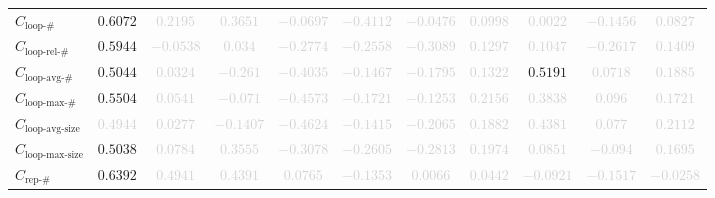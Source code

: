 \documentclass{standalone}
\newcommand{\loopnumname}{\text{loop-\#}}
\newcommand{\loopnum}{C_{\loopnumname}}
\newcommand{\looprelnumname}{\text{loop-rel-\#}}
\newcommand{\looprelnum}{C_{\looprelnumname}}
\newcommand{\loopavgname}{\text{loop-avg-\#}}
\newcommand{\loopavg}{C_{\loopavgname}}
\newcommand{\loopmaxname}{\text{loop-max-\#}}
\newcommand{\loopmax}{C_{\loopmaxname}}
\newcommand{\loopavgsizename}{\text{loop-avg-size}}
\newcommand{\loopavgsize}{C_{\loopavgsizename}}
\newcommand{\loopmaxsizename}{\text{loop-max-size}}
\newcommand{\loopmaxsize}{C_{\loopmaxsizename}}
\newcommand{\repnumname}{\text{rep-\#}}
\newcommand{\repnum}{C_{\repnumname}}
\begin{document}
\begin{tabular}{lcccccccccc}
$\loopnum$ & $0.6072$ & \textcolor{lightgray}{$0.2195$} & \textcolor{lightgray}{$0.3651$} & \textcolor{lightgray}{$-0.0697$} & \textcolor{lightgray}{$-0.4112$} & \textcolor{lightgray}{$-0.0476$} & \textcolor{lightgray}{$0.0998$} & \textcolor{lightgray}{$0.0022$} & \textcolor{lightgray}{$-0.1456$} & \textcolor{lightgray}{$0.0827$} \\ 
$\looprelnum$ & $0.5944$ & \textcolor{lightgray}{$-0.0538$} & \textcolor{lightgray}{$0.034$} & \textcolor{lightgray}{$-0.2774$} & \textcolor{lightgray}{$-0.2558$} & \textcolor{lightgray}{$-0.3089$} & \textcolor{lightgray}{$0.1297$} & \textcolor{lightgray}{$0.1047$} & \textcolor{lightgray}{$-0.2617$} & \textcolor{lightgray}{$0.1409$} \\ 
$\loopavg$ & $0.5044$ & \textcolor{lightgray}{$0.0324$} & \textcolor{lightgray}{$-0.261$} & \textcolor{lightgray}{$-0.4035$} & \textcolor{lightgray}{$-0.1467$} & \textcolor{lightgray}{$-0.1795$} & \textcolor{lightgray}{$0.1322$} & $0.5191$ & \textcolor{lightgray}{$0.0718$} & \textcolor{lightgray}{$0.1885$} \\ 
$\loopmax$ & $0.5504$ & \textcolor{lightgray}{$0.0541$} & \textcolor{lightgray}{$-0.071$} & \textcolor{lightgray}{$-0.4573$} & \textcolor{lightgray}{$-0.1721$} & \textcolor{lightgray}{$-0.1253$} & \textcolor{lightgray}{$0.2156$} & \textcolor{lightgray}{$0.3838$} & \textcolor{lightgray}{$0.096$} & \textcolor{lightgray}{$0.1721$} \\ 
$\loopavgsize$ & \textcolor{lightgray}{$0.4944$} & \textcolor{lightgray}{$0.0277$} & \textcolor{lightgray}{$-0.1407$} & \textcolor{lightgray}{$-0.4624$} & \textcolor{lightgray}{$-0.1415$} & \textcolor{lightgray}{$-0.2065$} & \textcolor{lightgray}{$0.1882$} & \textcolor{lightgray}{$0.4381$} & \textcolor{lightgray}{$0.077$} & \textcolor{lightgray}{$0.2112$} \\ 
$\loopmaxsize$ & $0.5038$ & \textcolor{lightgray}{$0.0784$} & \textcolor{lightgray}{$0.3555$} & \textcolor{lightgray}{$-0.3078$} & \textcolor{lightgray}{$-0.2605$} & \textcolor{lightgray}{$-0.2813$} & \textcolor{lightgray}{$0.1974$} & \textcolor{lightgray}{$0.0851$} & \textcolor{lightgray}{$-0.094$} & \textcolor{lightgray}{$0.1695$} \\ 
$\repnum$ & $0.6392$ & \textcolor{lightgray}{$0.4941$} & \textcolor{lightgray}{$0.4391$} & \textcolor{lightgray}{$0.0765$} & \textcolor{lightgray}{$-0.1353$} & \textcolor{lightgray}{$0.0066$} & \textcolor{lightgray}{$0.0442$} & \textcolor{lightgray}{$-0.0921$} & \textcolor{lightgray}{$-0.1517$} & \textcolor{lightgray}{$-0.0258$} \\ 

\end{tabular}
\end{document}
